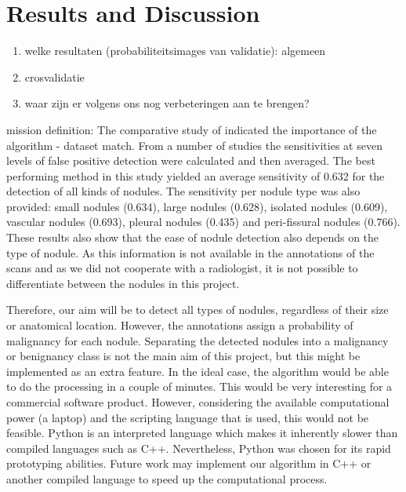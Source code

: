 \section{Results and Discussion}

\begin{enumerate}
\item welke resultaten (probabiliteitsimages van validatie): algemeen
\item crosvalidatie
\item waar zijn er volgens ons nog verbeteringen aan te brengen?
\end{enumerate}



mission definition:
The comparative study of \cite{ginneken} indicated the importance of the
algorithm - dataset match. From a number of studies the sensitivities at seven
levels of false positive detection were calculated and then averaged. The best
performing method in this study yielded an average sensitivity of 0.632 for the
detection of all kinds of nodules. The sensitivity per nodule type was also
provided: small nodules (0.634), large nodules (0.628), isolated nodules
(0.609), vascular nodules (0.693), pleural nodules (0.435) and peri-fissural
nodules (0.766).
These results also show that the ease of nodule detection also depends on the
type of nodule. As this information is not available in the annotations of the
scans and as we did not cooperate with a radiologist, it is not possible to
differentiate between the nodules in this project.

Therefore, our aim will be to
detect all types of nodules, regardless of their size or anatomical location.
However, the annotations assign a probability of malignancy for each nodule.
Separating the detected nodules into a malignancy or benignancy class is not the
main aim of this project, but this might be implemented as an extra feature.
In the ideal case, the algorithm would be able to do the processing in a couple
of minutes. This would be very interesting for a commercial software product.
However, considering the available computational power (a laptop) and the
scripting language that is used, this would not be feasible. Python is an
interpreted language which makes it inherently slower than compiled languages
such as C++. Nevertheless, Python was chosen for its rapid prototyping
abilities. Future work may implement our algorithm in C++ or another compiled
language to speed up the computational process.
